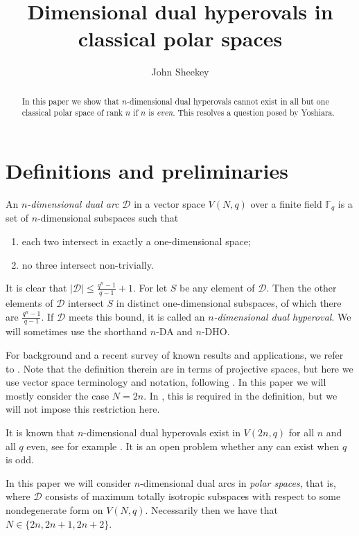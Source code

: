 \documentclass{amsart}
\theoremstyle{plain}
\theoremstyle{definition}
\begin{document}
\title{Dimensional dual hyperovals in classical polar spaces}
\author{John Sheekey}
\maketitle

\begin{abstract}
In this paper we show that $n$-dimensional dual hyperovals cannot exist in all but one classical polar space of rank $n$ if $n$ is \emph{even}. This resolves a question posed by Yoshiara.
\end{abstract}

\section{Definitions and preliminaries}

An \emph{$n$-dimensional dual arc} ${\mathcal D}$ in a vector space $V(N,q)$ over a finite field ${{\mathbb{F}}_q}$ is a set of $n$-dimensional subspaces such that
\begin{enumerate}
\item
each two intersect in exactly a one-dimensional space;
\item
no three intersect non-trivially.
\end{enumerate}
It is clear that $|{\mathcal D}| \leq \frac{q^n-1}{q-1}+1$. For let $S$ be any element of ${\mathcal D}$. Then the other elements of ${\mathcal D}$ intersect $S$ in distinct one-dimensional subspaces, of which there are $\frac{q^n-1}{q-1}$. If ${\mathcal D}$ meets this bound, it is called an \emph{$n$-dimensional dual hyperoval}. We will sometimes use the shorthand $n$-DA and $n$-DHO.

For background and a recent survey of known results and applications, we refer to \cite{Yoshiara2006}. Note that the definition therein are in terms of projective spaces, but here we use vector space terminology and notation, following \cite{DeKa2015}. In this paper we will mostly consider the case $N=2n$. In \cite{DeKa2015}, this is required in the definition, but we will not impose this restriction here.

It is known that $n$-dimensional dual hyperovals exist in $V(2n,q)$ for all $n$ and all $q$ even, see for example \cite{Yoshiara2006}. It is an open problem whether any can exist when $q$ is odd.

In this paper we will consider $n$-dimensional dual arcs in \emph{polar spaces}, that is, where ${\mathcal D}$ consists of maximum totally isotropic subspaces with respect to some nondegenerate form on $V(N,q)$. Necessarily then we have that $N \in \{2n,2n+1,2n+2\}$. 
\end{document}
